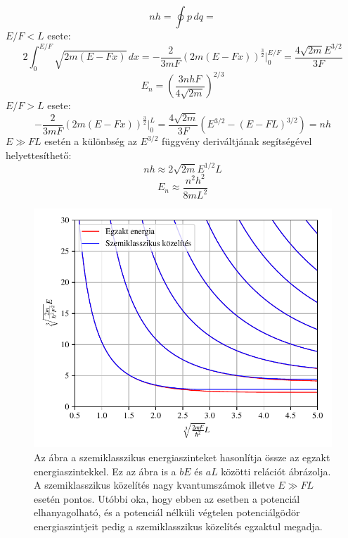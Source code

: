 \begin{equation}
		nh = \oint p \, dq = 
	\end{equation}
	$E/F < L$ esete:
	\begin{equation}
		2\int_0^{E/F}\sqrt{2m\left( E-Fx \right)}\,dx = -\frac{2}{3mF}\left(2m\left( E-Fx \right)\right)^{\frac{3}{2}}\bigg \rvert_0^{E/F} = \frac{4\sqrt{2m}E^{3/2}}{3F}
	\end{equation}
	\begin{equation}
		E_n = \left(\frac{3nhF}{4\sqrt{2m}}\right)^{2/3}
	\end{equation}
	$E/F > L$ esete:
	\begin{equation}
		-\frac{2}{3mF}\left(2m\left( E-Fx \right)\right)^{\frac{3}{2}}\bigg \rvert_0^{L} = \frac{4\sqrt{2m}}{3F}\left(E^{3/2} - \left(E - FL\right)^{3/2}\right) = nh
	\end{equation}
	$E \gg FL$ esetén a különbség az $E^{3/2}$ függvény deriváltjának segítségével helyettesíthető:
	\begin{equation}
		nh \approx 2\sqrt{2m}E^{1/2}L
	\end{equation}
	\begin{equation}
		E_n \approx \frac{n^2h^2}{8mL^2}
	\end{equation}
	
	\begin{figure}[H]
		\includegraphics[scale=1]{./figs/energiaszintkozelites.pdf}
		\caption[Szemiklasszikus energiaszintek]{Az ábra a szemiklasszikus energiaszinteket hasonlítja össze az egzakt energiaszintekkel. Ez az ábra is a $bE$ és $aL$ közötti relációt ábrázolja. A szemiklasszikus közelítés nagy kvantumszámok illetve $E \gg FL$ esetén pontos. Utóbbi oka, hogy ebben az esetben a potenciál elhanyagolható, és a potenciál nélküli végtelen potenciálgödör energiaszintjeit pedig a szemiklasszikus közelítés egzaktul megadja.}
	\end{figure}
	
